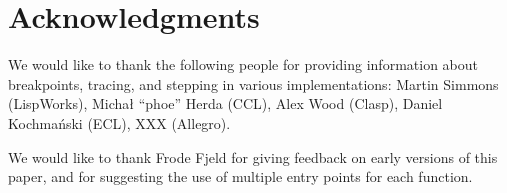 \section{Acknowledgments} 

We would like to thank the following people for providing information
about breakpoints, tracing, and stepping in various \commonlisp{}
implementations: Martin Simmons (LispWorks), Michał ``phoe'' Herda
(CCL), Alex Wood (Clasp), Daniel Kochmański (ECL), XXX (Allegro).

We would like to thank Frode Fjeld for giving feedback on early
versions of this paper, and for suggesting the use of multiple entry
points for each function.
